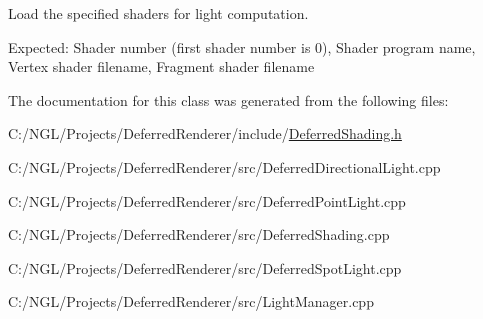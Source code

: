 Load the specified shaders for light computation. 

Expected\-: Shader number (first shader number is 0), Shader program name, Vertex shader filename, Fragment shader filename 

The documentation for this class was generated from the following files\-:\begin{DoxyCompactItemize}
\item 
C\-:/\-N\-G\-L/\-Projects/\-Deferred\-Renderer/include/\hyperlink{_deferred_shading_8h}{Deferred\-Shading.\-h}\item 
C\-:/\-N\-G\-L/\-Projects/\-Deferred\-Renderer/src/Deferred\-Directional\-Light.\-cpp\item 
C\-:/\-N\-G\-L/\-Projects/\-Deferred\-Renderer/src/Deferred\-Point\-Light.\-cpp\item 
C\-:/\-N\-G\-L/\-Projects/\-Deferred\-Renderer/src/Deferred\-Shading.\-cpp\item 
C\-:/\-N\-G\-L/\-Projects/\-Deferred\-Renderer/src/Deferred\-Spot\-Light.\-cpp\item 
C\-:/\-N\-G\-L/\-Projects/\-Deferred\-Renderer/src/Light\-Manager.\-cpp\end{DoxyCompactItemize}
